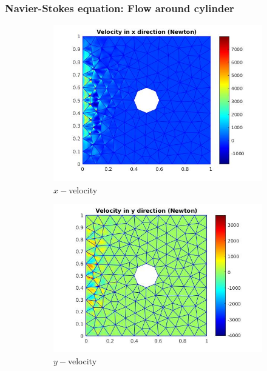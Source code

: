 \documentclass{beamer}
\begin{document}
\begin{frame}
\frametitle{Navier-Stokes equation: Flow around cylinder}
\begin{figure}
  \begin{subfigure}{0.3\textwidth}
    \includegraphics[width=\linewidth]{cylinder_newton_vx_bicgstab.jpg}
    \caption{$x-$velocity }
  \label{x_vel_navier_stoke_bicgstab}
  \end{subfigure}
  \begin{subfigure}{0.3\textwidth}
    \includegraphics[width=\linewidth]{cylinder_newton_vy_bicgstab.jpg}
    \caption{$y-$velocity}
  \label{y_vel_navier_stoke_bicgstab}
  \end{subfigure}
  \begin{subfigure}{0.3\textwidth}

\end{subfigure}
\end{figure}
\end{frame}
\end{document}
